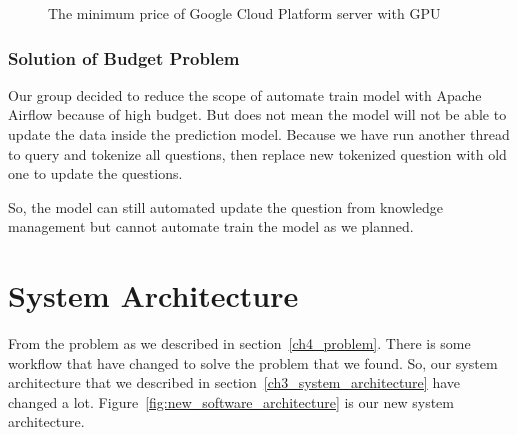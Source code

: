 \documentclass[12pt,oneside,openright,a4paper]{cpe-english-project}
\begin{document}
\begin{figure}[!h]\centering
{}
\caption{The minimum price of Google Cloud Platform server with GPU}
\label{fig:min_gcp_price}
\end{figure}

\subsubsection{Solution of Budget Problem}
Our group decided to reduce the scope of automate train model with Apache Airflow because of high budget.
But does not mean the model will not be able to update the data inside the prediction model.
Because we have run another thread to query and tokenize all questions,
then replace new tokenized question with old one to update the questions.

So, the model can still automated update the question from knowledge management
but cannot automate train the model as we planned.

\pagebreak
\section{System Architecture}
From the problem as we described in section~\ref*{ch4_problem}.
There is some workflow that have changed to solve the problem that we found.
So, our system architecture that we described in section~\ref*{ch3_system_architecture} have changed a lot.
Figure~\ref*{fig:new_software_architecture} is our new system architecture.
\end{document}
